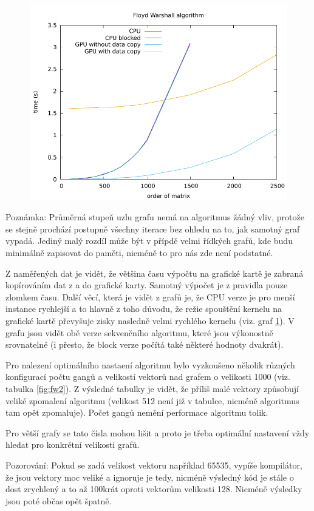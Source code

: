 \documentclass[11pt, fleqn]{article}
\begin{document}
\begin{figure}
  \centering
  \includegraphics[width=.7\linewidth]{../results/Floyd_Warshall.pdf}
  \label{fig:fw1}
\end{figure}

Poznámka: Průměrná stupeň uzlu grafu nemá na algoritmus žádný vliv, protože se stejně prochází postupně všechny iterace bez ohledu na to, jak samotný graf vypadá. Jediný malý rozdíl může být v přípdě velmi řídkých grafů, kde budu minimálně zapisovat do paměti, nicméně to pro nás zde není podstatné.

Z naměřených dat je vidět, že většina času výpočtu na grafické kartě je zabraná kopírováním dat z a do grafické karty. Samotný výpočet je z pravidla pouze zlomkem času. Další věcí, která je vidět z grafů je, že CPU verze je pro menší instance rychlejší a to hlavně z toho důvodu, že režie spouštění kernelu na grafické kartě převyšuje zisky nasledně velmi rychlého kernelu (viz. graf \ref{fig:fw1}). V grafu jsou vidět obě verze sekvenčního algoritmu, které jsou výkonostně srovnatelné (i přesto, že block verze počítá také některé hodnoty dvakrát).

Pro nalezení optimálního nastaení algoritmu bylo vyzkoušeno několik různých konfigurací počtu gangů a velikostí vektorů nad grafem o velikosti 1000 (viz. tabulka \ref{fig:fw2}). Z výsledné tabulky je vidět, že příliš malé vektory způsobují veliké zpomalení algoritmu (velikost 512 není již v tabulce, nicméně algoritmus tam opět zpomaluje). Počet gangů nemění performace algoritmu tolik.

Pro větší grafy se tato čísla mohou lišit a proto je třeba optimální nastavení vždy hledat pro konkrétní velikosti grafů.

Pozorování: Pokud se zadá velikost vektoru například 65535, vypíše kompilátor, že jsou vektory moc veliké a ignoruje je tedy, nicméně výsledný kód je stále o dost zrychlený a to až 100krát oproti vektorům velikosti 128. Nicméně výsledky jsou poté občas opět špatně. 
\end{document}
